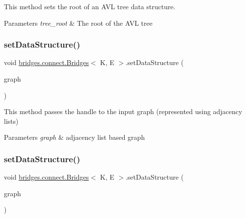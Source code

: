 This method sets the root of an A\+VL tree data structure.


\begin{DoxyParams}{Parameters}
{\em tree\+\_\+root} & The root of the A\+VL tree \\
\hline
\end{DoxyParams}
\hypertarget{classbridges_1_1connect_1_1_bridges_aa5dc1d094955a486e649fdb05d66502f}{}\label{classbridges_1_1connect_1_1_bridges_aa5dc1d094955a486e649fdb05d66502f} 
\subsubsection{\texorpdfstring{set\+Data\+Structure()}{setDataStructure()}\hspace{0.1cm}{\footnotesize\ttfamily [11/12]}}
{\footnotesize\ttfamily void \hyperlink{classbridges_1_1connect_1_1_bridges}{bridges.\+connect.\+Bridges}$<$ K, E $>$.set\+Data\+Structure (\begin{DoxyParamCaption}\item[{\hyperlink{classbridges_1_1base_1_1_graph_adj_list}{Graph\+Adj\+List}$<$ K, E $>$}]{graph }\end{DoxyParamCaption})}

This method passes the handle to the input graph (represented using adjacency lists)


\begin{DoxyParams}{Parameters}
{\em graph} & adjacency list based graph \\
\hline
\end{DoxyParams}
\hypertarget{classbridges_1_1connect_1_1_bridges_a1ac1f8a7c5e95500712c2edaa5e8971f}{}\label{classbridges_1_1connect_1_1_bridges_a1ac1f8a7c5e95500712c2edaa5e8971f} 
\subsubsection{\texorpdfstring{set\+Data\+Structure()}{setDataStructure()}\hspace{0.1cm}{\footnotesize\ttfamily [12/12]}}
{\footnotesize\ttfamily void \hyperlink{classbridges_1_1connect_1_1_bridges}{bridges.\+connect.\+Bridges}$<$ K, E $>$.set\+Data\+Structure (\begin{DoxyParamCaption}\item[{\hyperlink{classbridges_1_1base_1_1_graph_adj_matrix}{Graph\+Adj\+Matrix}$<$ K, E $>$}]{graph }\end{DoxyParamCaption})}

